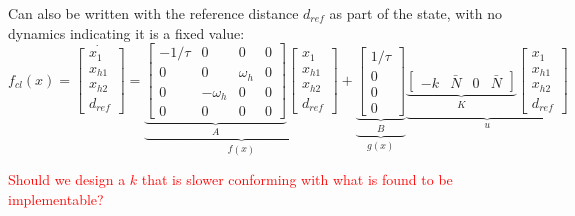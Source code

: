 Can also be written with the reference distance $d_{ref}$ as part of the state, with no dynamics indicating it is a fixed value:
\begin{equation}
f_{cl}(x)=\dot{\begin{bmatrix}
	x_1\\x_{h1}\\x_{h2}\\d_{ref}
	\end{bmatrix}} =
\underbrace{\underbrace{\begin{bmatrix}
		-1/\tau & 0 & 0 & 0\\0 & 0 & \omega_h & 0 \\ 0 & -\omega_h & 0 & 0 \\ 0& 0 & 0 & 0
		\end{bmatrix}}_{A}
	\begin{bmatrix}
	x_1\\x_{h1}\\x_{h2}\\d_{ref}
	\end{bmatrix}}_{f(x)}+ 
\underbrace{\underbrace{\begin{bmatrix}
		1/\tau \\ 0 \\ 0 \\ 0
		\end{bmatrix}}_{B}}_{g(x)}
\underbrace{\underbrace{\begin{bmatrix}
		-k & \bar{N} & 0 & \bar{N}
		\end{bmatrix}}_{K}
	\begin{bmatrix}
	x_1\\x_{h1}\\x_{h2}\\d_{ref}
	\end{bmatrix}}_{u}
\end{equation}

\textcolor{red}{Should we design a $k$ that is slower conforming with what is found to be implementable?}

